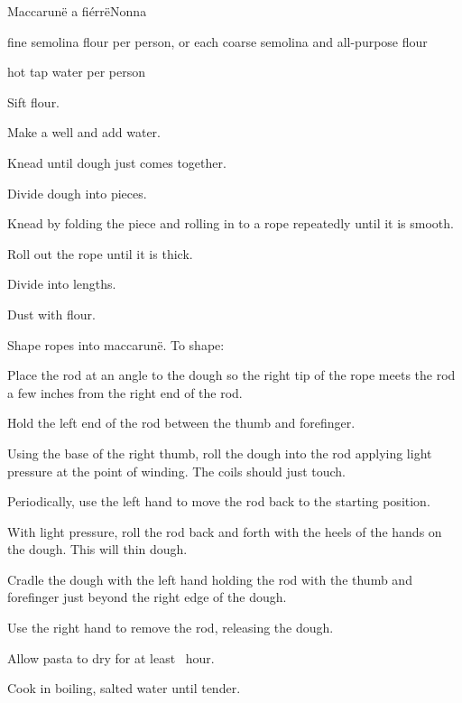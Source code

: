 \begin{recipe}{Maccarun\"e a fi\'err\"e}{Nonna}{}

\begin{ingredients}
\item {} fine semolina flour per person, or  each coarse semolina and all-purpose flour
\item {} hot tap water per person
\end{ingredients}

\begin{directions}
\item Sift flour.
\item Make a well and add water.
\item Knead until dough just comes together.
\item Divide dough into pieces.
\item Knead by folding the piece and rolling in to a rope repeatedly until it is smooth.
\item Roll out the rope until it is \inch{\quarter} thick.
\item Divide into  lengths.
\item Dust with flour.
\item Shape ropes into maccarun\"e. To shape:\par
\begin{enumerate*}
\item Place the rod at an angle to the dough so the right tip of the rope meets the rod a few inches from the right end of the rod.
\item Hold the left end of the rod between the thumb and forefinger.
\item Using the base of the right thumb, roll the dough into the rod applying light pressure at the point of winding. The coils should just touch.
\item Periodically, use the left hand to move the rod back to the starting position.
\item With light pressure, roll the rod back and forth with the heels of the hands on the dough. This will thin dough.
\item Cradle the dough with the left hand holding the rod with the thumb and forefinger just beyond the right edge of the dough.
\item Use the right hand to remove the rod, releasing the dough.
\end{enumerate*}
\item Allow pasta to dry for at least \half{}~hour.
\item Cook in boiling, salted water until tender.
\end{directions}

\end{recipe}

